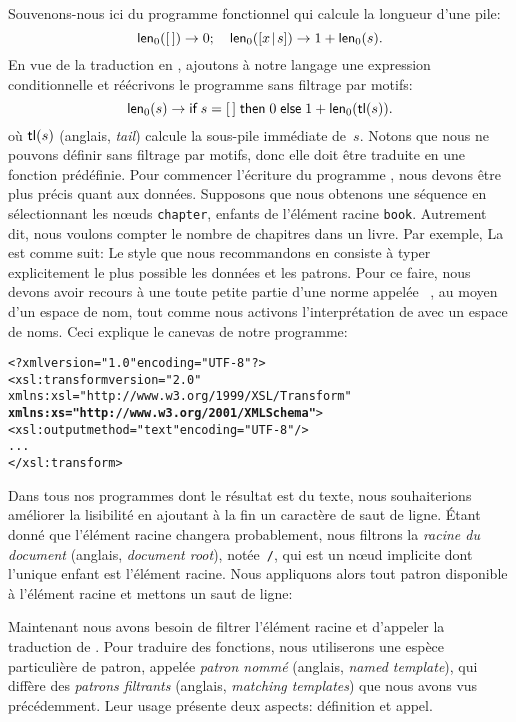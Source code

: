 
Souvenons-nous ici du programme fonctionnel qui calcule la longueur
d'une pile:
\begin{equation*}
\textsf{len}_0([\,]) \rightarrow 0;\quad
\textsf{len}_0([{x}\!\mid\!{s}]) \rightarrow 1 + \textsf{len}_0(s).
\end{equation*}
En vue de la traduction en \XSLT, ajoutons à notre langage une
expression conditionnelle et réécrivons le programme sans filtrage par motifs:
\begin{equation}
\textsf{len}_0(s) \rightarrow \textsf{if} \; s = [\,] \; \textsf{then} \; 0 \;
\textsf{else} \; 1 + \textsf{len}_0(\textsf{tl}(s)).
\label{def_len0_xslt}
\end{equation}
où \(\textsf{tl}(s)\) (anglais, \emph{tail}) calcule la sous-pile
immédiate de~\(s\). Notons que nous ne pouvons définir 
sans filtrage par motifs, donc elle doit être traduite en une fonction
prédéfinie. Pour commencer l'écriture du programme \XSLT, nous devons
être plus précis quant aux données. Supposons que nous obtenons une
séquence en sélectionnant les n{\oe}uds \texttt{chapter}, enfants de
l'élément racine \texttt{book}. Autrement dit, nous voulons compter le
nombre de chapitres dans un livre. Par exemple,
\noindent La \DTD est comme suit:
Le style que nous recommandons en \XSLT consiste à typer explicitement
le plus possible les données et les patrons. Pour ce faire, nous
devons avoir recours à une toute petite partie d'une norme appelée
\XMLSchema~\citep{Walmsley_2002}, au moyen d'un espace de nom, tout
comme nous activons l'interprétation de \XSLT avec un espace de noms.
Ceci explique le canevas de notre programme:
\begin{alltt}
\small<?xml version="1.0" encoding="UTF-8"?>
<xsl:transform version="2.0"
               xmlns:xsl="http://www.w3.org/1999/XSL/Transform"
               \textbf{xmlns:xs="http://www.w3.org/2001/XMLSchema"}>
  <xsl:output method="text" encoding="UTF-8"/>
  ...
</xsl:transform>
\end{alltt}
Dans tous nos programmes \XSLT dont le résultat est du texte, nous
souhaiterions améliorer la lisibilité en ajoutant à la fin un
caractère de saut de ligne. Étant donné que l'élément racine changera
probablement, nous filtrons la \emph{racine du document} (anglais,
\emph{document root}), notée~\texttt{/}, qui est un n{\oe}ud implicite
dont l'unique enfant est l'élément racine. Nous appliquons alors tout
patron disponible à l'élément racine et mettons un saut de ligne:
Maintenant nous avons besoin de filtrer l'élément racine et d'appeler
la traduction de . Pour traduire des fonctions, nous
utiliserons une espèce particulière de patron, appelée \emph{patron
  nommé} (anglais, \emph{named template}), qui diffère des
\emph{patrons filtrants} (anglais, \emph{matching templates}) que nous
avons vus précédemment. Leur usage présente deux aspects: définition
et appel.

